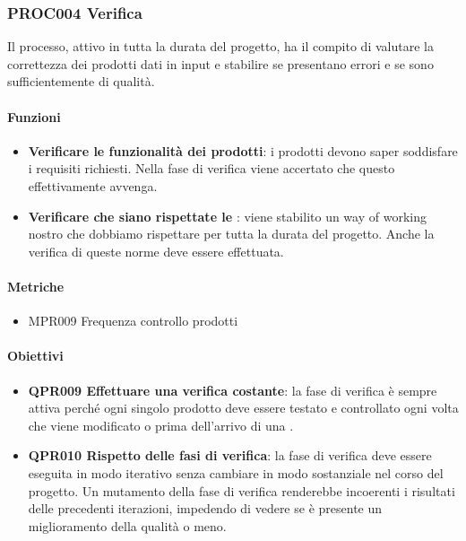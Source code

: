	\subsubsection{PROC004 Verifica}
	Il processo, attivo in tutta la durata del progetto, ha il compito di valutare la correttezza dei prodotti dati in input e stabilire se presentano errori
	e se sono sufficientemente di qualità.
	
		\paragraph*{Funzioni}
		
		\begin{itemize}
			\item \textbf{Verificare le funzionalità dei prodotti}: i prodotti devono saper soddisfare i requisiti richiesti. Nella fase di verifica viene accertato che questo effettivamente avvenga.
			\item \textbf{Verificare che siano rispettate le \NdP}: viene stabilito un way of working nostro che dobbiamo rispettare per tutta la durata del progetto. Anche la verifica di queste norme deve essere effettuata.
		\end{itemize}
		
		\paragraph*{Metriche}
		
		\begin{itemize}
			\item MPR009 Frequenza controllo prodotti
		\end{itemize}
		
		\paragraph*{Obiettivi}
		
		\begin{itemize}
			\item \textbf{QPR009 Effettuare una verifica costante}: la fase di verifica è sempre attiva perché ogni singolo prodotto deve essere testato e controllato ogni volta che viene modificato o prima dell'arrivo di una .
			\item \textbf{QPR010 Rispetto delle fasi di verifica}: la fase di verifica deve essere eseguita in modo iterativo senza cambiare in modo sostanziale nel corso del progetto. Un mutamento della fase di verifica renderebbe incoerenti i risultati delle precedenti iterazioni, impedendo di vedere se è presente un miglioramento della qualità o meno.
		\end{itemize}


